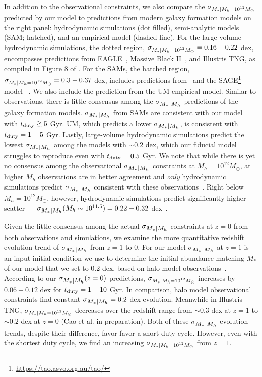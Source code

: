 \documentclass[12pt, letterpaper, preprint, tighten]{aastex62}
\newcommand{\edt}[1]{{\color{dred}{\bf} #1}}
\newcommand{\siglogm}{\sigma_{\scaleto{M_*|M_h}{8pt}}}
\newcommand{\sigtwe}{\sigma_{\scaleto{M_*|M_h=10^{12}M_\odot}{8pt}}}
\begin{document}
In addition to the observational constraints, we also compare the $\sigtwe$
predicted by our model to predictions from modern galaxy formation models
on the right panel: hydrodynamic simulations (dot filled), semi-analytic models
(SAM; hatched), and an empirical model (dashed line). For the large-volume hydrodynamic 
simulations, the dotted region, $\sigtwe = 0.16 - 0.22$ dex, encompasses
predictions from EAGLE~\citep{matthee2017}, Massive Black II~\citep{khandai2015},
and Illustris TNG, as compiled in Figure 8 of \cite{wechsler2018}.
For the SAMs, the hatched region, $\sigtwe = 0.3 - 0.37$ dex, includes predictions 
from~\cite{lu2014, somerville2012} and the SAGE\footnote{\url{https://tao.asvo.org.au/tao/}}
model~\edt{\citep{croton2016}}. We also include the prediction from the
\cite{behroozi2019} UM empirical model. Similar to observations, there is 
little consensus among the $\siglogm$ predictions of the galaxy formation models.
$\siglogm$ from SAMs are consistent with our model with $t_{\rm duty} \gtrsim 5$ Gyr. 
UM, which predicts a lower $\siglogm$, is consistent with $t_{\rm duty} = 1 - 5$ Gyr.
Lastly, large-volume hydrodynamic simulations predict the lowest $\siglogm$ among the models
with $\sim 0.2$ dex, which our fiducial model struggles to reproduce even with 
$t_{\rm duty} = 0.5$ Gyr. We note that while there is yet no consensus among the 
observational $\siglogm$ constraints at $M_h=10^{12} M_\odot$, at higher $M_h$ 
observations are in better agreement and {\em only} hydrodynamic simulations 
predict $\siglogm$ consistent with these observations~\citep{wechsler2018}. Right 
below $M_h=10^{12}M_\odot$, however, hydrodynamic simulations predict significantly 
higher scatter --- $\siglogm(M_h\sim 10^{11.5}) = 0.22 - 0.32$ dex~\citep{wechsler2018}.

Given the little consensus among the actual $\siglogm$ constraints at $z=0$ 
from both observations and simulations, we examine the more quantitative redshift 
evolution trend of $\siglogm$ from $z=1$ to 0. For our model $\siglogm$ at $z=1$ 
is an input initial condition we
use to determine the initial abundance matching $M_*$ of our model that we set to 0.2 dex, based 
on halo model observations~\citep[\emph{e.g.}][]{leauthaud2012, tinker2013, patel2015}. 
According to our $\siglogm(z=0)$ predictions, $\sigtwe$ increases 
by $0.06 - 0.12$ dex for $t_{\rm duty} = 1-10$ Gyr. In comparison, halo model observational constraints find 
constant $\siglogm=0.2$ dex evolution. Meanwhile in Illustris TNG, $\sigtwe$ 
decreases over the redshift range from $\sim 0.3$ dex at $z=1$ to $\sim 0.2$ dex 
at $z=0$ (Cao et al. in preparation). Both of these $\siglogm$ evolution 
trends, despite their difference, favor favor a short duty cycle. However, even with the 
shortest duty cycle, we find an increasing $\sigtwe$ from $z=1$. 
 
\end{document}
